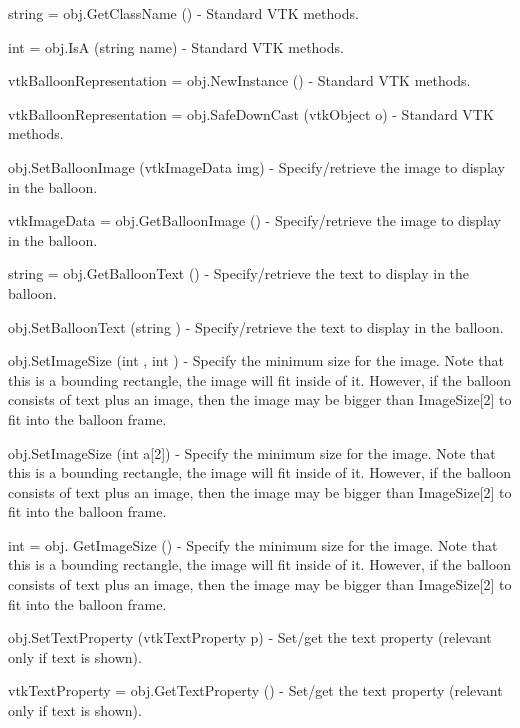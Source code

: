 \begin{DoxyItemize}
\item {\ttfamily string = obj.\-Get\-Class\-Name ()} -\/ Standard V\-T\-K methods.  
\item {\ttfamily int = obj.\-Is\-A (string name)} -\/ Standard V\-T\-K methods.  
\item {\ttfamily vtk\-Balloon\-Representation = obj.\-New\-Instance ()} -\/ Standard V\-T\-K methods.  
\item {\ttfamily vtk\-Balloon\-Representation = obj.\-Safe\-Down\-Cast (vtk\-Object o)} -\/ Standard V\-T\-K methods.  
\item {\ttfamily obj.\-Set\-Balloon\-Image (vtk\-Image\-Data img)} -\/ Specify/retrieve the image to display in the balloon.  
\item {\ttfamily vtk\-Image\-Data = obj.\-Get\-Balloon\-Image ()} -\/ Specify/retrieve the image to display in the balloon.  
\item {\ttfamily string = obj.\-Get\-Balloon\-Text ()} -\/ Specify/retrieve the text to display in the balloon.  
\item {\ttfamily obj.\-Set\-Balloon\-Text (string )} -\/ Specify/retrieve the text to display in the balloon.  
\item {\ttfamily obj.\-Set\-Image\-Size (int , int )} -\/ Specify the minimum size for the image. Note that this is a bounding rectangle, the image will fit inside of it. However, if the balloon consists of text plus an image, then the image may be bigger than Image\-Size\mbox{[}2\mbox{]} to fit into the balloon frame.  
\item {\ttfamily obj.\-Set\-Image\-Size (int a\mbox{[}2\mbox{]})} -\/ Specify the minimum size for the image. Note that this is a bounding rectangle, the image will fit inside of it. However, if the balloon consists of text plus an image, then the image may be bigger than Image\-Size\mbox{[}2\mbox{]} to fit into the balloon frame.  
\item {\ttfamily int = obj. Get\-Image\-Size ()} -\/ Specify the minimum size for the image. Note that this is a bounding rectangle, the image will fit inside of it. However, if the balloon consists of text plus an image, then the image may be bigger than Image\-Size\mbox{[}2\mbox{]} to fit into the balloon frame.  
\item {\ttfamily obj.\-Set\-Text\-Property (vtk\-Text\-Property p)} -\/ Set/get the text property (relevant only if text is shown).  
\item {\ttfamily vtk\-Text\-Property = obj.\-Get\-Text\-Property ()} -\/ Set/get the text property (relevant only if text is shown).  

\end{DoxyItemize}
